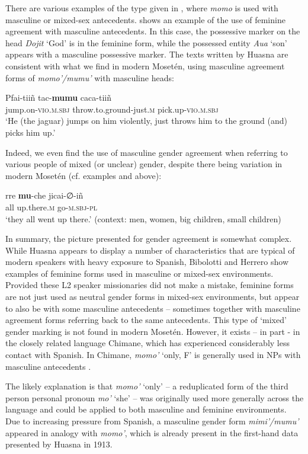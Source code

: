 \documentclass[output=paper,colorlinks,citecolor=brown
]{langscibook}
\begin{document}
There are various examples of the type given in , where \textit{momo} is used with masculine or mixed-sex antecedents.  shows an example of the use of feminine agreement with masculine antecedents. In this case, the possessive marker on the head \textit{Dojit} ‘God’ is in the feminine form, while the possessed entity \textit{Aua} ‘son’ appears with a masculine possessive marker.	
The texts written by Huasna are consistent with what we find in modern Mosetén, using masculine agreement forms of \textit{momo’/mumu’} with masculine heads:

\ea \label{sakel_example_12}
\gll Pfai-tiiñ		tac-\textbf{mumu}			caca-tiiñ\\
     jump.on-\textsc{vio.m.sbj}	throw.to.ground-just.\textsc{m}	pick.up-\textsc{vio.m.sbj}\\
\glt ‘He (the jaguar) jumps on him violently, just throws him to the ground (and) picks him up.’
\z	

Indeed, we even find the use of masculine gender agreement when referring to various people of mixed (or unclear) gender, despite there being variation in modern Mosetén (cf. examples  and  above):


\ea \label{sakel_example_13}
\gll rre	\textbf{mu}-che	jicai-∅-iñ\\
     all	up.there.\textsc{m}	go-\textsc{m.sbj-pl}\\
\glt ‘they all went up there.’ (context: men, women, big children, small children)
\z	

In summary, the picture presented for gender agreement is somewhat complex. While Huasna appears to display a number of characteristics that are typical of modern speakers with heavy exposure to Spanish, Bibolotti and Herrero show examples of feminine forms used in masculine or mixed-sex environments. 
Provided these L2 speaker missionaries did not make a mistake, feminine forms are not just used as neutral gender forms in mixed-sex environments, but appear to also be with some masculine antecedents – sometimes together with masculine agreement forms referring back to the same antecedents. This type of ‘mixed’ gender marking is not found in modern Mosetén. However, it exists – in part - in the closely related language Chimane, which has experienced considerably less contact with Spanish. In Chimane, \textit{momo’} ‘only, F’ is generally used in NPs with masculine antecedents \citep{gill1999pedagogical}.

The likely explanation is that \textit{momo’} ‘only’ -- a reduplicated form of the third person personal pronoun \textit{mo’} ‘she’ -- was originally used more generally across the language and could be applied to both masculine and feminine environments. Due to increasing pressure from Spanish, a masculine gender form \textit{mimi’/mumu’} appeared in analogy with \textit{momo’}, which is already present in the first-hand data presented by Huasna in 1913.
\end{document}
